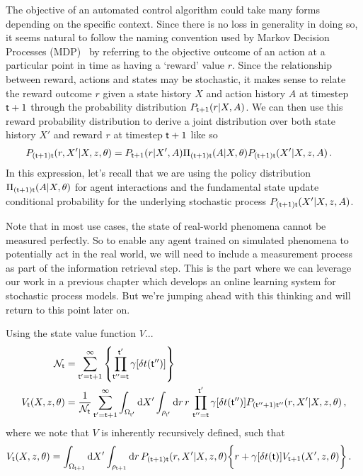 The objective of an automated control algorithm could take many forms depending on the specific context. Since there is no loss in generality in doing so, it seems natural to follow the naming convention used by Markov Decision Processes (MDP)~\cite{bertsekas2011dynamic,sutton2018reinforcement} by referring to the objective outcome of an action at a particular point in time as having a `reward' value $r$. Since the relationship between reward, actions and states may be stochastic, it makes sense to relate the reward outcome $r$ given a state history $X$ and action history $A$ at timestep ${\sf t}+1$ through the probability distribution $P_{{\sf t}+1}(r\vert X,A)$. We can then use this reward probability distribution to derive a joint distribution over both state history $X'$ and reward $r$ at timestep ${\sf t}+1$ like so
\begin{align}
P_{({\sf t}+1){\sf t}}(r,X'\vert X, z,\theta) &= P_{{\sf t}+1}(r\vert X',A)\Pi_{({\sf t}+1){\sf t}}(A\vert X,\theta)P_{({\sf t}+1){\sf t}}(X'\vert X,z,A) \,.
\end{align}
In this expression, let's recall that we are using the policy distribution $\Pi_{({\sf t}+1){\sf t}}(A\vert X,\theta)$ for agent interactions and the fundamental state update conditional probability for the underlying stochastic process $P_{({\sf t}+1){\sf t}}(X'\vert X,z,A)$.

Note that in most use cases, the state of real-world phenomena cannot be measured perfectly. So to enable any agent trained on simulated phenomena to potentially act in the real world, we will need to include a measurement process as part of the information retrieval step. This is the part where we can leverage our work in a previous chapter which develops an online learning system for stochastic process models. But we're jumping ahead with this thinking and will return to this point later on.

Using the state value function $V$...
\begin{align}
{\cal N}_{{\sf t}} &= \sum_{{\sf t}'={\sf t}+1}^{\infty}\left\{ \prod_{{\sf t}''={\sf t}}^{{\sf t}'} \gamma [\delta t({\sf t}'')] \right\} \\
V_{{\sf t}}(X,z,\theta) &= \frac{1}{{\cal N}_{{\sf t}}}\sum_{{\sf t}'={\sf t}+1}^{\infty} \int_{\Omega_{{\sf t}'}}{\rm d}X'\int_{\rho_{{\sf t}'}} {\rm d}r \,r\, \prod_{{\sf t}''={\sf t}}^{{\sf t}'} \gamma [\delta t({\sf t}'')]P_{({\sf t}''+1){\sf t}''}(r,X'\vert X, z,\theta) \,,
\end{align}
where we note that $V$ is inherently recursively defined, such that
\begin{align}
V_{{\sf t}}(X,z,\theta) &= \int_{\Omega_{{\sf t}+1}}{\rm d}X'\int_{\rho_{{\sf t}+1}} {\rm d}r \, P_{({\sf t}+1){\sf t}}(r,X'\vert X, z,\theta)\bigg\{ r+\gamma [\delta t({\sf t})]V_{{\sf t}+1}(X',z,\theta)\bigg\} \,.
\end{align}

